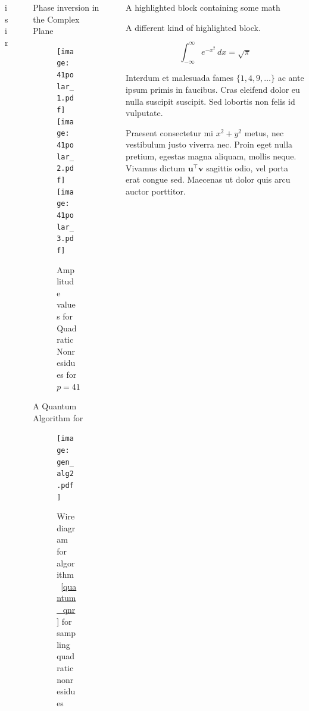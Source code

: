 \documentclass[final]{beamer}
\providecommand{\QNR}{\csword{QNR}}
\newlength{\sepwidth}
\newlength{\colwidth}
\newcommand{\separatorcolumn}{\begin{column}{\sepwidth}\end{column}}
\begin{document}
\begin{frame}[t]
\begin{columns}[t]
\begin{column}{\colwidth}
\begin{exampleblock}{\QNR is in \EQPC}
  \end{exampleblock}
\end{column}

\separatorcolumn

\begin{column}{\colwidth}

  \begin{block}{Phase inversion in the Complex Plane}
    \begin{figure}
      \centering
      \texttt{[image: 41polar\_1.pdf]}
    \hfill\texttt{[image: 41polar\_2.pdf]}
    \hfill\texttt{[image: 41polar\_3.pdf]}
      \caption{Amplitude values for Quadratic Nonresidues for $p=41$}
    \end{figure}

  \end{block}


  \begin{block}{A Quantum Algorithm for \QNR}

\begin{figure}[h]
\centering
  \texttt{[image: gen\_alg2.pdf]}
  \caption{Wire diagram for algorithm~\ref{quantum_qnr} for sampling quadratic nonresidues}
\label{fig:gen_alg}
\end{figure}
  \end{block}

\end{column}

\separatorcolumn

\begin{column}{\colwidth}

  \begin{exampleblock}{A highlighted block containing some math}

    A different kind of highlighted block.

    $$
    \int_{-\infty}^{\infty} e^{-x^2}\,dx = \sqrt{\pi}
    $$

    Interdum et malesuada fames $\{1, 4, 9, \ldots\}$ ac ante ipsum primis in
    faucibus. Cras eleifend dolor eu nulla suscipit suscipit. Sed lobortis non
    felis id vulputate.


    Praesent consectetur mi $x^2 + y^2$ metus, nec vestibulum justo viverra
    nec. Proin eget nulla pretium, egestas magna aliquam, mollis neque. Vivamus
    dictum $\mathbf{u}^\intercal\mathbf{v}$ sagittis odio, vel porta erat
    congue sed. Maecenas ut dolor quis arcu auctor porttitor.


\end{exampleblock}
\end{column}
\end{columns}
\end{frame}
\end{document}
